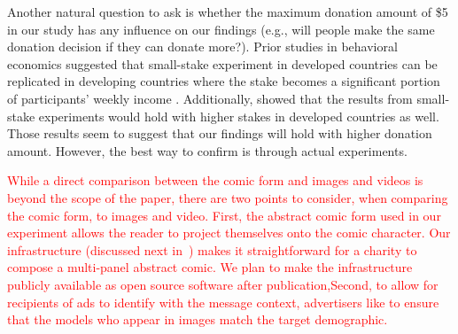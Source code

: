 \begin{description} [leftmargin=\parindent,topsep=0pt,partopsep=3pt,parsep=0pt,itemsep=3pt, listparindent=\parindent]
    \item[Donation Amount:] Another natural question to ask is whether the maximum donation amount of  \$5  in our study has any influence on our findings (e.g., will people make the same donation decision if they can donate more?).  Prior studies in behavioral economics suggested that small-stake experiment in developed countries can be replicated in developing countries where the stake becomes a significant portion of participants' weekly income \cite{binswanger1980attitudes,binswanger1981attitudes,kachelmeier1992examining}. Additionally, \textcite{post2008deal} showed that the results from small-stake experiments would hold with higher stakes in developed countries as well. Those results seem to suggest that our findings will hold with higher donation amount. However, the best way to confirm is through actual experiments. 
    \item[Other Media Forms:] \textcolor{red}{While a direct comparison between the comic form and images and videos is beyond the scope of the paper, there are two points to consider, when comparing the comic form, to images and video. First, the abstract comic form used in our experiment allows the reader to project themselves onto the comic character. Our infrastructure (discussed next in~) makes it straightforward for a charity to compose a multi-panel  abstract comic. We plan to make the infrastructure publicly available as open source software after publication,Second, to allow for recipients of ads to identify with the message context, advertisers like to ensure that the models who appear in images match the target demographic.} 
     

\end{description}
